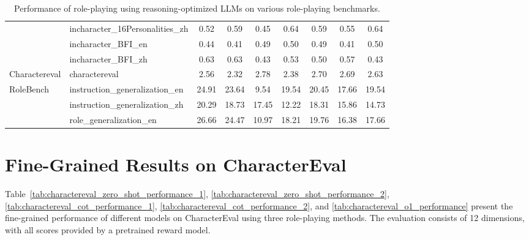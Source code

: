 \begin{table*}[ht]
{\begin{tabular}{llccccccc}
 & incharacter\_16Personalities\_zh & 0.52 & 0.59 & 0.45 & 0.64 & 0.59 & 0.55 & 0.64 \\
 & incharacter\_BFI\_en & 0.44 & 0.41 & 0.49 & 0.50 & 0.49 & 0.41 & 0.50 \\
 & incharacter\_BFI\_zh & 0.63 & 0.63 & 0.43 & 0.53 & 0.50 & 0.57 & 0.43 \\
 \midrule
Charactereval & charactereval & 2.56 & 2.32 & 2.78 & 2.38 & 2.70 & 2.69 & 2.63 \\
\midrule
\multirow{3}{*}{RoleBench} & instruction\_generalization\_en & 24.91 & 23.64 & 9.54 & 19.54 & 20.45 & 17.66 & 19.54 \\
 & instruction\_generalization\_zh & 20.29 & 18.73 & 17.45 & 12.22 & 18.31 & 15.86 & 14.73 \\
 & role\_generalization\_en & 26.66 & 24.47 & 10.97 & 18.21 & 19.76 & 16.38 & 17.66 \\
\bottomrule
\end{tabular}%
}
\caption{Performance of role-playing using reasoning-optimized LLMs on various role-playing benchmarks.}
\label{tab:o1_performance}
\end{table*}



\section{Fine-Grained Results on CharacterEval}\label{app:sec:charactereval}


Table~\ref{tab:charactereval_zero_shot_performance_1}, \ref{tab:charactereval_zero_shot_performance_2}, \ref{tab:charactereval_cot_performance_1}, \ref{tab:charactereval_cot_performance_2}, and \ref{tab:charactereval_o1_performance} present the fine-grained performance of different models on CharacterEval using three role-playing methods.
The evaluation consists of 12 dimensions, with all scores provided by a pretrained reward model.

